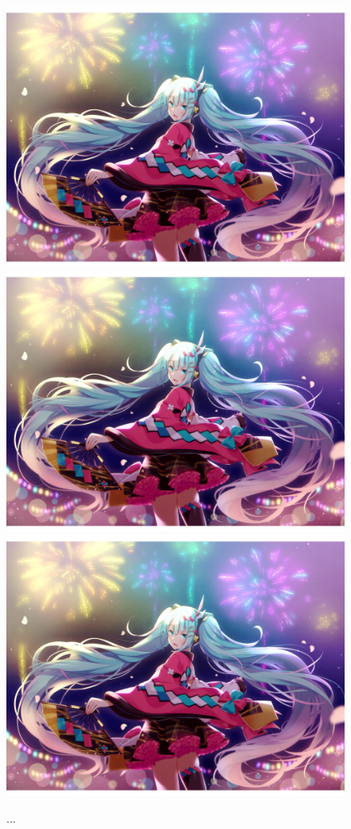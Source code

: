 \documentclass[UTF8]{ctexart}
\begin{document}
	\begin{figure}[htbp]
		\centering
		{\includegraphics[scale=.3]{figures/miku-01.png}}
		\qquad
		{\includegraphics[scale=.4]{figures/miku-01.png}} \\[2pt]
		{\includegraphics[scale=.7]{figures/miku-01.png}}
		\caption{...}
	\end{figure}
\end{document}
